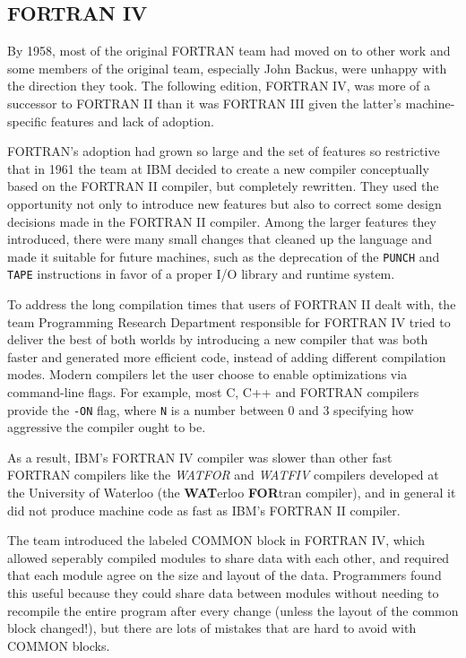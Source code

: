 \subsection{FORTRAN IV}

By 1958, most of the original FORTRAN team had moved on to other work and
some members of the original team, especially John Backus, were unhappy with
the direction they took.
The following edition, FORTRAN IV, was more of a successor to FORTRAN II than
it was FORTRAN III given the latter's machine-specific features and
lack of adoption.

FORTRAN's adoption had grown so large and the set of features so restrictive
that in 1961 the team at IBM decided to create a new compiler conceptually
based on the FORTRAN II compiler, but completely rewritten.
They used the opportunity not only to introduce new features but also to
correct some design decisions made in the FORTRAN II compiler.
Among the larger features they introduced, there were many small changes that
cleaned up the language and made it suitable for future machines,
such as the deprecation of the \texttt{PUNCH} and \texttt{TAPE}
instructions in favor of a proper I/O library and runtime system.

To address the long compilation times that users of FORTRAN II dealt with,
the team Programming Research Department responsible for FORTRAN IV
tried to deliver the best of both worlds by introducing a new compiler
that was both faster and generated more efficient code, instead of adding
different compilation modes. Modern compilers let the user choose to enable
optimizations via command-line flags. For example, most C, C++ and FORTRAN compilers
provide the \texttt{-ON} flag, where \texttt{N} is a number
between 0 and 3 specifying how aggressive the compiler ought to be.

As a result, IBM's FORTRAN IV compiler was slower than other fast FORTRAN compilers
like the \textit{WATFOR} and \textit{WATFIV} compilers developed at the University of Waterloo
(the \textbf{WAT}erloo \textbf{FOR}tran compiler\cite{cress_dirksen_graham_watfor_fortran_iv_1970}),
and in general it did not produce machine code as fast as IBM's FORTRAN II compiler.

The team introduced the labeled COMMON block in FORTRAN IV, which allowed
seperably compiled modules to share data with each other,
and required that each module agree on the size and layout of the data.
Programmers found this useful because they could share data between modules
without needing to recompile the entire program after every change
(unless the layout of the common block changed!),
but there are lots of mistakes that are hard to avoid with COMMON blocks.

